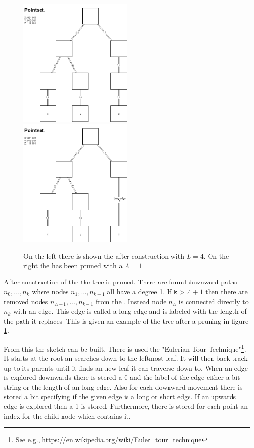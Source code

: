 \begin{figure}
\includegraphics[width=0.5\textwidth]{figures/quadtree}
\includegraphics[width=0.5\textwidth]{figures/prunnedquadtree}
\caption{On the left there is shown the \qt{} after construction with $L=4$. On the right the \qt{} has been pruned with a $\Lambda = 1$}
\label{fig:quadtree}
\end{figure}

After construction of the \qt{} the tree is pruned. There are found downward paths $n_0,...,n_k$ where nodes $n_1,...,n_{k-1}$ all have a degree 1. If \ensuremath{\texttt{k} > \Lambda+1} then there are removed nodes $n_{\Lambda+1},...,n_{k-1}$ from the \qt{}. Instead node $n_{\Lambda}$ is connected directly to $n_{k}$ with an edge. This edge is called a long edge and is labeled with the length of the path it replaces. This is given an example of the tree after a pruning in figure \ref{fig:quadtree}.


From this the sketch can be built. There is used the "Eulerian Tour Technique"\footnote{See e.g., \url{https://en.wikipedia.org/wiki/Euler\_tour\_technique}}.
It starts at the root an searches down to the leftmost leaf. It will then back track up to its parents until it finds an new leaf it can traverse down to. When an edge is explored downwards there is stored a 0 and the label of the edge either a bit string or the length of an long edge. Also for each downward movement there is stored a bit specifying if the given edge is a long or short edge. If an upwards edge is explored then a 1 is stored. Furthermore, there is stored for each point an index for the child node which contains it.

